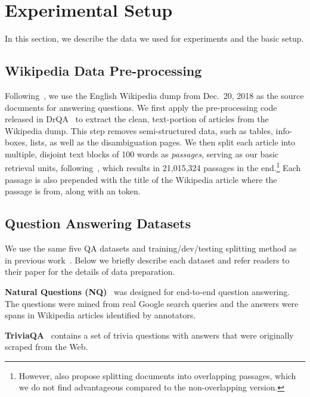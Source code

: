 
\section{Experimental Setup}
\label{sec:exp-setup}

In this section, we describe the data we used for experiments and the basic setup.


\subsection{Wikipedia Data Pre-processing}
\label{sec:wiki-preprocessing}

Following~\cite{lee2019latent}, we use the English Wikipedia dump from Dec.~20, 2018 as the source documents for answering questions.
We first apply the pre-processing code released in DrQA~\cite{chen2017reading} to extract the clean, text-portion of articles from the Wikipedia dump.
This step removes semi-structured data, such as tables, info-boxes, lists, as well as the disambiguation pages.
We then split each article into multiple, disjoint text blocks of 100 words as \emph{passages}, serving as our basic retrieval units, following~\cite{wang2019multi}, which results in 21,015,324 passages in the end.\footnote{However, \citet{wang2019multi} also propose splitting documents into overlapping passages, which we do not find advantageous compared to the non-overlapping version.}
Each passage is also prepended with the title of the Wikipedia article where the passage is from, along with an \ttt{[SEP]} token.%


\subsection{Question Answering Datasets}
\label{sec:qa-datasets}

We use the same five QA datasets and training/dev/testing splitting method as in previous work~\cite{lee2019latent}.
Below we briefly describe each dataset and refer readers to their paper for the details of data preparation.

\noindent
\textbf{Natural Questions (NQ)}~\cite{kwiatkowski2019natural} was designed for end-to-end question answering.
The questions were mined from real Google search queries and the answers were spans in Wikipedia articles identified by annotators.

\noindent
\textbf{TriviaQA}~\cite{joshi-etal-2017-triviaqa} contains a set of trivia questions with answers that were originally scraped from the Web.

